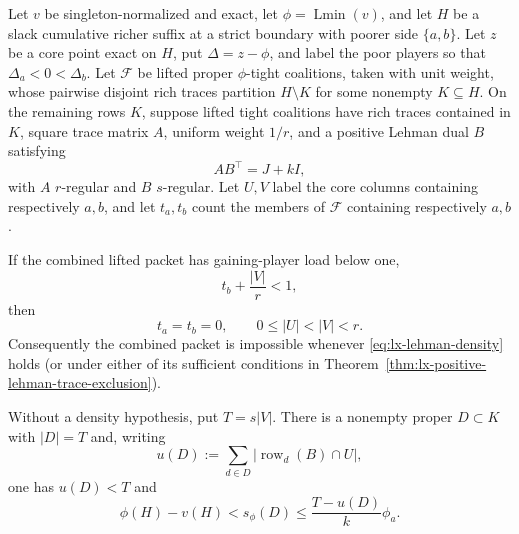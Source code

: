 \begin{corollary}
\label{cor:lx-deficit-preserving-lehman-minor}
Let $v$ be singleton-normalized and exact, let
$\phi=\operatorname{Lmin}(v)$, and let $H$ be a slack cumulative richer
suffix at a strict boundary with poorer side $\{a,b\}$.  Let $z$ be a core
point exact on $H$, put $\Delta=z-\phi$, and label the poor players so that
$\Delta_a<0<\Delta_b$.  Let
$\mathcal F$ be lifted proper $\phi$-tight coalitions, taken with unit
weight, whose pairwise disjoint rich traces partition $H\setminus K$ for
some nonempty $K\subseteq H$.  On the remaining rows $K$, suppose lifted
tight coalitions have rich traces contained in $K$, square trace matrix $A$,
uniform weight $1/r$, and a positive Lehman dual $B$ satisfying
\[
 AB^\top=J+kI,
\]
with $A$ $r$-regular and $B$ $s$-regular.  Let $U,V$ label the core
columns containing respectively $a,b$, and let $t_a,t_b$ count the members
of $\mathcal F$ containing respectively $a,b$.

If the combined lifted packet has gaining-player load below one,
\[
 t_b+\frac{|V|}{r}<1,                              \tag{LM-1}
 \label{eq:lx-lehman-minor-deficit}
\]
then
\[
 t_a=t_b=0,
 \qquad 0\leq |U|<|V|<r.                           \tag{LM-2}
 \label{eq:lx-lehman-minor-labels}
\]
Consequently the combined packet is impossible whenever
\eqref{eq:lx-lehman-density} holds (or under either of its sufficient
conditions in Theorem~\ref{thm:lx-positive-lehman-trace-exclusion}).

Without a density hypothesis, put $T=s|V|$.  There is a nonempty proper
$D\subset K$ with $|D|=T$ and, writing
\[
 u(D):=\sum_{d\in D}|\operatorname{row}_d(B)\cap U|,
\]
one has $u(D)<T$ and
\[
 \phi(H)-v(H)<s_\phi(D)
 \leq\frac{T-u(D)}{k}\phi_a.                       \tag{LM-3}
 \label{eq:lx-lehman-minor-face}
\]
\end{corollary}

